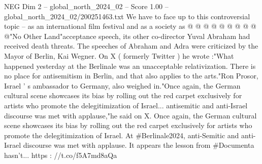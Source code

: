 \begin{textsample}{NEG Dim 2 – global\_north\_2024\_02 – Score 1.00 – global\_north\_2024\_02/200251463.txt}
We have to face up to this controversial topic -- as an international film festival and as a society as @ @ @ @ @ @ @ @ @ @"No Other Land"acceptance speech, its other co-director Yuval Abraham had received death threats.
The speeches of Abraham and Adra were criticized by the Mayor of Berlin, Kai Wegner.
On X ( formerly Twitter ) he wrote :"What happened yesterday at the Berlinale was an unacceptable relativization.
There is no place for antisemitism in Berlin, and that also applies to the arts."Ron Prosor, Israel ' s ambassador to Germany, also weighed in."Once again, the German cultural scene showcases its bias by rolling out the red carpet exclusively for artists who promote the delegitimization of Israel... antisemitic and anti-Israel discourse was met with applause,"he said on X.
Once again, the German cultural scene showcases its bias by rolling out the red carpet exclusively for artists who promote the delegitimization of Israel.
At \#Berlinale2024, anti-Semitic and anti-Israel discourse was met with applause.
It appears the lesson from \#Documenta hasn't... https : //t.co/f5A7md8aQa

\end{textsample}
